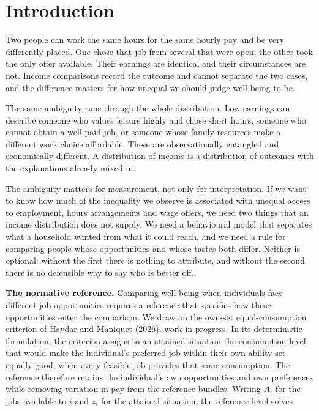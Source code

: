 \section{Introduction}\label{introduction}

Two people can work the same hours for the same hourly pay and be very differently placed. One chose that job from several that were open; the other took the only offer available. Their earnings are identical and their circumstances are not. Income comparisons record the outcome and cannot separate the two cases, and the difference matters for how unequal we should judge well-being to be.

The same ambiguity runs through the whole distribution. Low earnings can describe someone who values leisure highly and chose short hours, someone who cannot obtain a well-paid job, or someone whose family resources make a different work choice affordable. These are observationally entangled and economically different. A distribution of income is a distribution of outcomes with the explanations already mixed in.

The ambiguity matters for measurement, not only for interpretation. If we want to know how much of the inequality we observe is associated with unequal access to employment, hours arrangements and wage offers, we need two things that an income distribution does not supply. We need a behavioural model that separates what a household wanted from what it could reach, and we need a rule for comparing people whose opportunities and whose tastes both differ. Neither is optional: without the first there is nothing to attribute, and without the second there is no defensible way to say who is better off.

\textbf{The normative reference.} Comparing well-being when individuals face different job opportunities requires a reference that specifies how those opportunities enter the comparison. We draw on the own-set equal-consumption criterion of Haydar and Maniquet (2026), work in progress. In its deterministic formulation, the criterion assigns to an attained situation the consumption level that would make the individual's preferred job within their own ability set equally good, when every feasible job provides that same consumption. The reference therefore retains the individual's own opportunities and own preferences while removing variation in pay from the reference bundles. Writing \(A_i\) for the jobs available to \(i\) and \(z_i\) for the attained situation, the reference level solves

